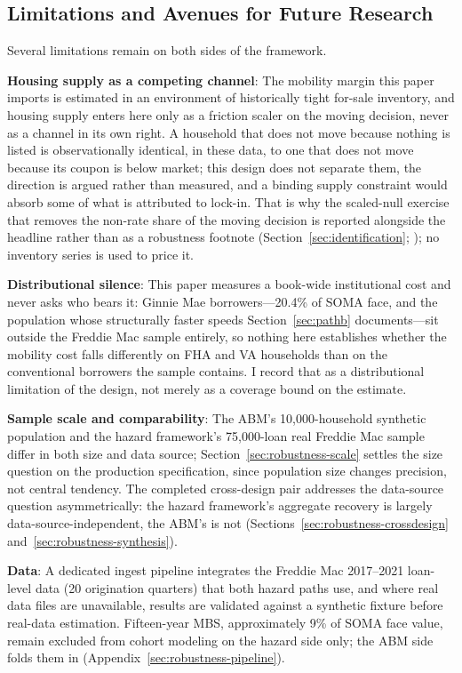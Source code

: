 \subsection{Limitations and Avenues for Future Research}\label{sec:limitations}

Several limitations remain on both sides of the framework.

\textbf{Housing supply as a competing channel}: The mobility margin this paper imports is estimated in an environment of historically tight for-sale inventory, and housing supply enters here only as a friction scaler on the moving decision, never as a channel in its own right. A household that does not move because nothing is listed is observationally identical, in these data, to one that does not move because its coupon is below market; this design does not separate them, the direction is argued rather than measured, and a binding supply constraint would absorb some of what is attributed to lock-in. That is why the scaled-null exercise that removes the non-rate share of the moving decision is reported alongside the headline rather than as a robustness footnote (Section~\ref{sec:identification}; \citealp{aladangady2024,hsieh2019}); no inventory series is used to price it.

\textbf{Distributional silence}: This paper measures a book-wide institutional cost and never asks who bears it: Ginnie Mae borrowers---20.4\% of SOMA face, and the population whose structurally faster speeds Section~\ref{sec:pathb} documents---sit outside the Freddie Mac sample entirely, so nothing here establishes whether the mobility cost falls differently on FHA and VA households than on the conventional borrowers the sample contains. I record that as a distributional limitation of the design, not merely as a coverage bound on the estimate.

\textbf{Sample scale and comparability}: The ABM's 10,000-household synthetic population and the hazard framework's 75,000-loan real Freddie Mac sample differ in both size and data source; Section~\ref{sec:robustness-scale} settles the size question on the production specification, since population size changes precision, not central tendency. The completed cross-design pair addresses the data-source question asymmetrically: the hazard framework's aggregate recovery is largely data-source-independent, the ABM's is not (Sections~\ref{sec:robustness-crossdesign} and~\ref{sec:robustness-synthesis}).

\textbf{Data}: A dedicated ingest pipeline integrates the Freddie Mac 2017--2021 loan-level data (20 origination quarters) that both hazard paths use, and where real data files are unavailable, results are validated against a synthetic fixture before real-data estimation. Fifteen-year MBS, approximately 9\% of SOMA face value, remain excluded from cohort modeling on the hazard side only; the ABM side folds them in (Appendix~\ref{sec:robustness-pipeline}).

